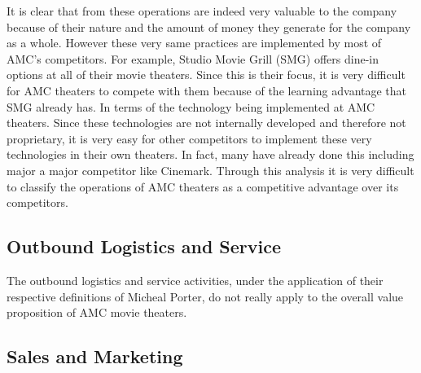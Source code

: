 \documentclass[12pt]{article}
\begin{document}
It is clear that from these operations are indeed very valuable to the company because of their nature and the amount of money they generate for the company as a whole. However these very same practices are implemented by most of AMC's competitors. For example, Studio Movie Grill (SMG) offers dine-in options at all of their movie theaters. Since this is their focus, it is very difficult for AMC theaters to compete with them because of the learning advantage that SMG already has. In terms of the technology being implemented at AMC theaters. Since these technologies are not internally developed and therefore not proprietary, it is very easy for other competitors to implement these very technologies in their own theaters. In fact, many have already done this including major a major competitor like Cinemark. Through this analysis it is very difficult to classify the operations of AMC theaters as a competitive advantage over its competitors. 

\subsection{Outbound Logistics and Service}
The outbound logistics and service activities, under the application of their respective definitions of Micheal Porter, do not really apply to the overall value proposition of AMC movie theaters. 

\subsection{Sales and Marketing}
\end{document}
